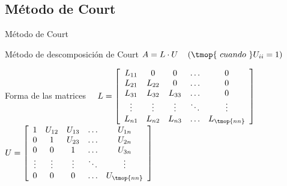 \documentclass [8pt] {beamer}
\begin{document}
    \subsection{Método de Court}
        \begin{frame}{Método de Court}
            \begin{block}{Método de descomposición de Court}
                { $A = L \cdot U \ \ \ \left(\tmop{\ cuando \ }U_{i i} = 1\right)$}
            \end{block}
            \begin{block}{Forma de las matrices}
                {\ \ $L = \left[ \begin{array}{ccccc}
                L_{11} & 0 & 0 & \ldots & 0\\
                L_{21} & L_{22} & 0 & \ldots & 0\\
                L_{31} & L_{32} & L_{33} & \ldots & 0\\
                \vdots & \vdots & \vdots & \ddots & \vdots\\
                L_{n 1} & L_{n 2} & L_{n 3} & \ldots & L_{\tmop{nn}}
                \end{array} \right]$ \ \ \ \ \ \ \ \ \ \ \ $U = \left[ \begin{array}{ccccc}
                1 & U_{12} & U_{13} & \ldots & U_{1 n}\\
                0 & 1 & U_{23} & \ldots & U_{2 n}\\
                0 & 0 & 1 & \ldots & U_{3 n}\\
                \vdots & \vdots & \vdots & \ddots & \vdots\\
                0 & 0 & 0 & \ldots & U_{\tmop{nn}}
                \end{array} \right]$}
            \end{block}
        \end{frame}
\end{document}
